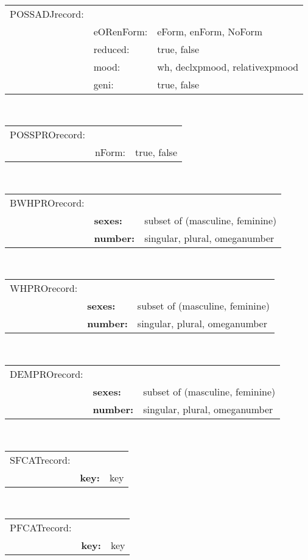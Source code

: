 \\
\begin{tabular}{lll}
POSSADJrecord: &                  &              \\
               & eORenForm:       & eForm, enForm, NoForm \\
               & reduced:         & true, false           \\
               & mood:            & wh, declxpmood, relativexpmood \\
               & geni:            & true, false           \\
\end{tabular}
\\
\begin{tabular}{lll}
POSSPROrecord: &                   &              \\
               & nForm:            & true, false \\
\end{tabular}
\\
\begin{tabular}{lll}
BWHPROrecord: &                  &              \\
             & {\bf sexes:}     & subset of (masculine, feminine) \\
             & {\bf number:}    & singular, plural, omeganumber   \\
\end{tabular}
\\
\begin{tabular}{lll}
WHPROrecord: &                  &              \\
             & {\bf sexes:}     & subset of (masculine, feminine) \\
             & {\bf number:}    & singular, plural, omeganumber   \\
\end{tabular}
\\
\begin{tabular}{lll}
DEMPROrecord: &                 &              \\
              & {\bf sexes:}    & subset of (masculine, feminine) \\
              & {\bf number:}   & singular, plural, omeganumber   \\
\end{tabular}
\\
\begin{tabular}{lll}
SFCATrecord: &                 &              \\
             & {\bf key:}      & key     \\
\end{tabular}
\\
\begin{tabular}{lll}
PFCATrecord: &                 &              \\
             & {\bf key:}      & key     \\
\end{tabular}
\\

